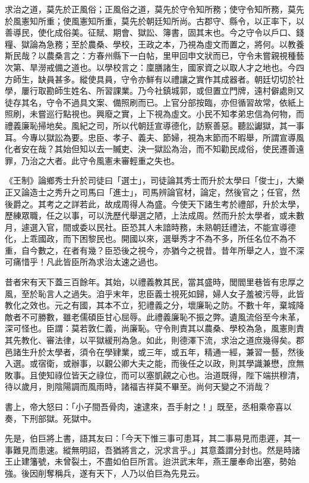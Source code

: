 \begin{pinyinscope}
求治之道，莫先於正風俗；正風俗之道，莫先於守令知所務；使守令知所務，莫先於風憲知所重；使風憲知所重，莫先於朝廷知所尚。古郡守、縣令，以正率下，以善導民，使化成俗美。征賦、期會、獄訟、簿書，固其末也。今之守令以戶口、錢糧、獄論為急務；至於農桑、學校，王政之本，乃視為虛文而置之，將何。以教養斯民哉？以農桑言之：方春州縣下一白帖，里甲回申文狀而已，守令未嘗親視種藝次第、旱澇戒備之道也。以學校言之：廩膳諸生，國家資之以取人才之地也。今四方師生，缺員甚多。縱使具員，守令亦鮮有以禮讓之實作其成器者。朝廷切切於社學，屢行取勘師生姓名、所習課業。乃今社鎮城郭，或但置立門牌，遠村僻處則又徒存其名，守令不過具文案、備照刷而已。上官分部按臨，亦但循習故常，依紙上照刷，未嘗巡行點視也。興廢之實，上下視為虛文。小民不知孝弟忠信為何物，而禮義廉恥掃地矣。風紀之司，所以代朝廷宣導德化，訪察善惡。聽訟讞獄，其一事耳。今專以獄訟為要。忠臣、孝子、義夫、節婦，視為末節而不暇舉，所謂宣導風化者安在哉？其始但知以去一贓吏、決一獄訟為治，而不知勸民成俗，使民遷善遠罪，乃治之大者。此守令風憲未審輕重之失也。

《王制》論鄉秀士升於司徒曰「選士」，司徒論其秀士而升於太學曰「俊士」，大樂正又論造士之秀升之司馬曰「進士」，司馬辨論官材，論定，然後官之；任官，然後爵之。其考之之詳若此，故成周得人為盛。今使天下諸生考於禮部，升於太學，歷練眾職，任之以事，可以洗歷代舉選之陋，上法成周。然而升於太學者，或未數月，遽選入官，間或委以民社。臣恐其人未諳時務，未熟朝廷禮法，不能宣導德化，上乖國政，而下困黎民也。開國以來，選舉秀才不為不多，所任名位不為不重，自今數之，在者有幾？臣恐後之視今，亦猶今之視昔。昔年所舉之人，豈不深可痛惜乎！凡此皆臣所為求治太速之過也。

昔者宋有天下蓋三百餘年。其始，以禮義教其民，當其盛時，閭閻里巷皆有忠厚之風，至於恥言人之過失。洎乎末年，忠臣義士視死如歸，婦人女子羞被污辱，此皆教化之效也。元之有國，其本不立，犯禮義之分，壞廉恥之防。不數十年，棄城降敵者不可勝數，雖老儒碩臣甘心屈辱。此禮義廉恥不振之弊。遺風流俗至今未革，深可怪也。臣謂：莫若敦仁義，尚廉恥。守令則責其以農桑、學校為急，風憲則責其先教化、審法律，以平獄緩刑為急。如此，則德澤下流，求治之道庶幾得矣。郡邑諸生升於太學者，須令在學肄業，或三年，或五年，精通一經，兼習一藝，然後入選。或宿衛，或辦事，以觀公卿大夫之能，而後任之以政，則其學識兼懋，庶無敗事。且使知祿位皆天之祿位，而可以塞凱覦之心也。治道既得，陛下端拱穆清，待以歲月，則陰陽調而風雨時，諸福吉祥莫不畢至。尚何天變之不消哉？

書上，帝大怒曰：「小子間吾骨肉，速逮來，吾手射之！」既至，丞相乘帝喜以奏，下刑部獄。死獄中。

先是，伯巨將上書，語其友曰：「今天下惟三事可患耳，其二事易見而患遲，其一事難見而患速。縱無明詔，吾猶將言之，況求言乎。」其意蓋謂分封也。然是時諸王止建籓號，未曾裂土，不盡如伯巨所言。迨洪武末年，燕王屢奉命出塞，勢始強。後因削奪稱兵，遂有天下，人乃以伯巨為先見云。


\end{pinyinscope}
